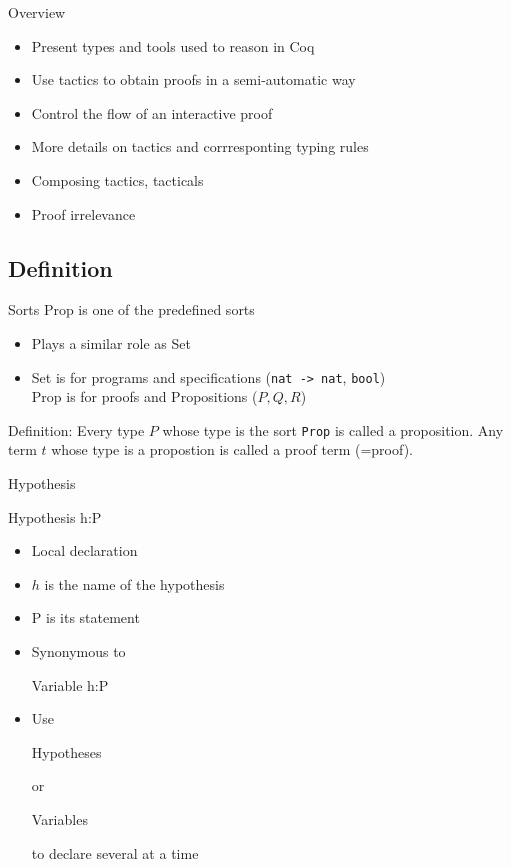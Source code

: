 \begin{frame}{Overview}
	\begin{itemize}
		\item Present types and tools used to reason in Coq
		\pause
		\item Use tactics to obtain proofs in a semi-automatic way
		\pause
		\item Control the flow of an interactive proof
		\pause				
		\item More details on tactics and corrresponting typing rules
		\pause
		\item Composing tactics, tacticals
		\pause
		\item Proof irrelevance
	\end{itemize}
\end{frame}

\subsection{Definition}
\begin{frame}[fragile]{Sorts}
	Prop is one of the predefined sorts
	\begin{itemize}
		\item Plays a similar role as Set 
		\pause
		\item Set is for programs and specifications (\verb|nat -> nat|, \verb|bool|)\\
		Prop is for proofs and Propositions ($P, Q, R$)
	\end{itemize}
	\pause
	Definition: Every type $P$ whose type is the sort \verb|Prop| is called a proposition. Any term $t$ whose type is a propostion is called a proof term (=proof).
\end{frame}
\begin{frame}[fragile]{Hypothesis}
	\begin{user}
	Hypothesis h:P
	\end{user}
	\begin{itemize}
		\item Local declaration
		\pause
		\item $h$ is the name of the hypothesis
		\pause
		\item P is its statement
		\pause
		\item Synonymous to
		\begin{user}
		Variable h:P
		\end{user}
		\pause
		\item Use
		\begin{user}
		Hypotheses
		\end{user}
		or
		\begin{user}
		Variables
		\end{user}
		to declare several at a time
	\end{itemize}
\end{frame}

